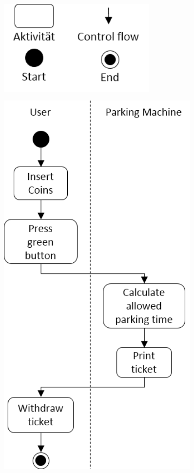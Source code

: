 \begin{figure}[H] 
    \begin{minipage}[m]{.5\linewidth}
        \centering
        \includegraphics[width=0.7\textwidth]{img/adSymb.png}
        \label{fig:adSymb}
    \end{minipage}%
    \begin{minipage}[m]{.5\linewidth}
        \centering
        \includegraphics[width=0.9\textwidth]{img/activityDiagram.png}

\end{minipage}
\end{figure}
